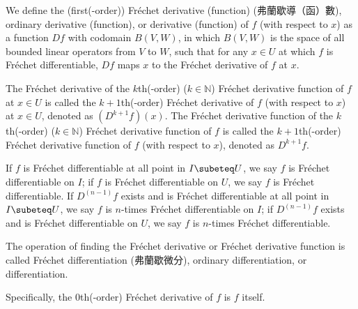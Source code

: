 \documentclass[a4paper,12pt]{report}
\begin{document}
\begin{itemize}
\begin{itemize}
We define the (first(-order)) Fréchet derivative (function) (弗蘭歇導（函）數), ordinary derivative (function), or derivative (function) of $f$ (with respect to $x$) as a function $Df$ with codomain $B(V,W)$, in which $B(V,W)$ is the space of all bounded linear operators from $V$ to $W$, such that for any $x\in U$ at which $f$ is Fréchet differentiable, $Df$ maps $x$ to the Fréchet derivative of $f$ at $x$.

The Fréchet derivative of the $k$th(-order) ($k\in\mathbb{N}$) Fréchet derivative function of $f$ at $x\in U$ is called the $k+1$th(-order) Fréchet derivative of $f$ (with respect to $x$) at $x\in U$, denoted as $(D^{k+1}f)(x)$. The Fréchet derivative function of the $k$th(-order) ($k\in\mathbb{N}$) Fréchet derivative function of $f$ is called the $k+1$th(-order) Fréchet derivative function of $f$ (with respect to $x$), denoted as $D^{k+1}f$.

If $f$ is Fréchet differentiable at all point in $I\subeteq U$, we say $f$ is Fréchet differentiable on $I$; if $f$ is Fréchet differentiable on $U$, we say $f$ is Fréchet differentiable. If $D^{(n-1)}f$ exists and is Fréchet differentiable at all point in $I\subeteq U$, we say $f$ is $n$-times Fréchet differentiable on $I$; if $D^{(n-1)}f$ exists and is Fréchet differentiable on $U$, we say $f$ is $n$-times Fréchet differentiable.

The operation of finding the Fréchet derivative or Fréchet derivative function is called Fréchet differentiation (弗蘭歇微分), ordinary differentiation, or differentiation.

Specifically, the $0$th(-order) Fréchet derivative of $f$ is $f$ itself.


\end{itemize}
\end{itemize}
\end{document}
